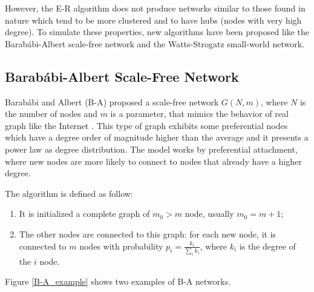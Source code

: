 However, the E-R algorithm does not produce networks similar to those found in nature which tend to be more clustered and to have hubs (nodes with very high degree). To simulate these properties, new algorithms have been proposed like the Barab\'abi-Albert scale-free network and the Watts-Strogatz small-world network.

\subsection{Barab\'abi-Albert Scale-Free Network}
Barab\'abi and Albert (B-A) proposed a scale-free network $G(N, m)$, where $N$ is the number of nodes and $m$ is a parameter, that mimics the behavior of real graph like the Internet \cite{Barabasi_Albert_1999}. This type of graph exhibits some preferential nodes which have a degree order of magnitude higher than the average and it presents a power law as degree distribution.
The model works by preferential attachment, where new nodes are more likely to connect to nodes that already have a higher degree. 

The algorithm is defined as follow:
\begin{enumerate}
    \item It is initialized a complete graph of $m_0 > m$ node, usually $m_0 = m+1$;
    \item The other nodes are connected to this graph: for each new node, it is connected to $m$ nodes with probability $p_i = \frac{k_i}{\sum_i k_i}$, where $k_i$ is the degree of the $i$ node.
\end{enumerate}
Figure \ref{B-A_example} shows two examples of B-A networks.

